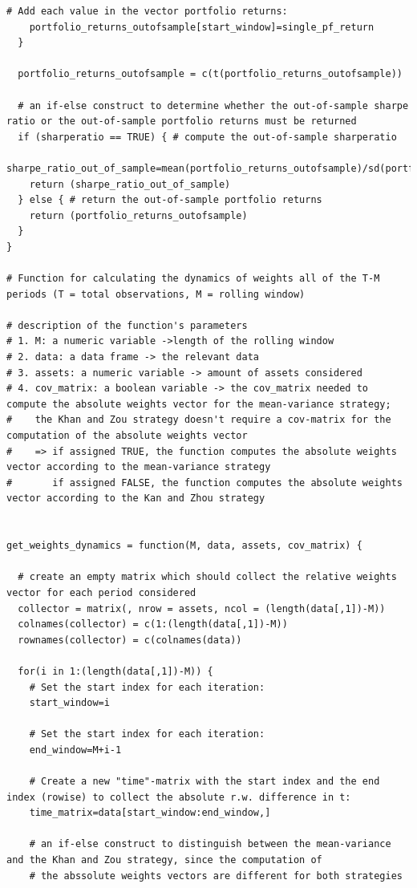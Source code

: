 \documentclass{article}
\begin{document}
\begin{lstlisting}[caption={This listing shows the entire code developed in R.}, label=code:1,frame=single]
    # Add each value in the vector portfolio returns:
    portfolio_returns_outofsample[start_window]=single_pf_return
  }
  
  portfolio_returns_outofsample = c(t(portfolio_returns_outofsample))
  
  # an if-else construct to determine whether the out-of-sample sharpe ratio or the out-of-sample portfolio returns must be returned
  if (sharperatio == TRUE) { # compute the out-of-sample sharperatio
    sharpe_ratio_out_of_sample=mean(portfolio_returns_outofsample)/sd(portfolio_returns_outofsample)
    return (sharpe_ratio_out_of_sample) 
  } else { # return the out-of-sample portfolio returns
    return (portfolio_returns_outofsample)
  }
}

# Function for calculating the dynamics of weights all of the T-M periods (T = total observations, M = rolling window)  

# description of the function's parameters
# 1. M: a numeric variable ->length of the rolling window
# 2. data: a data frame -> the relevant data 
# 3. assets: a numeric variable -> amount of assets considered
# 4. cov_matrix: a boolean variable -> the cov_matrix needed to compute the absolute weights vector for the mean-variance strategy;
#    the Khan and Zou strategy doesn't require a cov-matrix for the computation of the absolute weights vector
#    => if assigned TRUE, the function computes the absolute weights vector according to the mean-variance strategy
#       if assigned FALSE, the function computes the absolute weights vector according to the Kan and Zhou strategy


get_weights_dynamics = function(M, data, assets, cov_matrix) {
  
  # create an empty matrix which should collect the relative weights vector for each period considered
  collector = matrix(, nrow = assets, ncol = (length(data[,1])-M))
  colnames(collector) = c(1:(length(data[,1])-M))
  rownames(collector) = c(colnames(data))
  
  for(i in 1:(length(data[,1])-M)) {
    # Set the start index for each iteration:
    start_window=i
    
    # Set the start index for each iteration:
    end_window=M+i-1
    
    # Create a new "time"-matrix with the start index and the end index (rowise) to collect the absolute r.w. difference in t:
    time_matrix=data[start_window:end_window,]
    
    # an if-else construct to distinguish between the mean-variance and the Khan and Zou strategy, since the computation of
    # the abssolute weights vectors are different for both strategies
    

\end{lstlisting}
\end{document}
